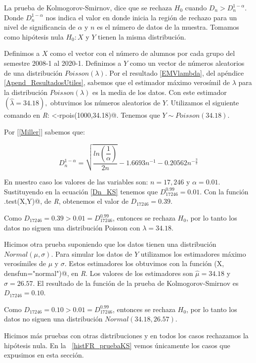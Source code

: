 La prueba de Kolmogorov-Smirnov, dice que se rechaza $H_{0}$ cuando $D_{n} > D_{n}^{1-\alpha}$. Donde $D_{n}^{1-\alpha}$ nos indica el valor en donde inicia la región de rechazo para un nivel de significancia de $\alpha$ y $n$ es el número de datos de la muestra. Tomamos como hipótesis nula $H_{0}: X$ y $Y$ tienen la misma distribución.

Definimos a $X$ como el vector con el número de alumnos por cada grupo del semestre 2008-1 al 2020-1. Definimos a $Y$ como un vector de números aleatorios de una distribución $Poisson(\lambda)$. Por el resultado \ref{EMVlambda}, del apéndice \ref{Apend_ResultadosUtiles}, sabemos que el estimador máximo verosímil de $\lambda$ para la distribución $Poisson(\lambda)$ es la media de los datos. Con este estimador $(\hat{\lambda} = 34.18),$ obtuvimos los números aleatorios de $Y$. Utilizamos el siguiente comando en \textit{R}: \verb@Y<-rpois(1000,34.18)@. Tenemos que $Y \sim Poisson(34.18)$.%

Por [\ref{Miller}] sabemos que:
  
  \begin{equation}\label{Dn_KS}
D_{n}^{1-\alpha} = \sqrt{\dfrac{ln \left(\dfrac{1}{\alpha}\right)}{2n}} - 1.6693 n^{-1} - 0.20562 n^{-\frac{3}{2}}
\end{equation}

En nuestro caso los valores de las variables son: $n = 17,246$ y $\alpha = 0.01$. Sustituyendo en la ecuación \ref{Dn_KS} tenemos que $D_{17246}^{0.99} = 0.01$. Con la función \verb@ks.test(X,Y)@, de \textit{R}, obtenemos el valor de $D_{17246} = 0.39$.

Como $D_{17246} = 0.39 > 0.01 = D_{17246}^{0.99}$, entonces se rechaza $H_{0}$, por lo tanto los datos no siguen una distribución Poisson con $\lambda = 34.18$.


Hicimos otra prueba suponiendo que los datos tienen una distribución $Normal(\mu,\sigma)$. Para simular los datos de $Y$ utilizamos los estimadores máximo verosímiles de $\mu$ y $\sigma$. Estos estimadores los obtuvimos con la función \verb@fitdistr(X, densfun="normal")@, en \textit{R}. Los valores de los estimadores son $\hat{\mu} = 34.18$ y $\hat{\sigma} = 26.57$. El resultado de la función de la prueba de Kolmogorov-Smirnov es $D_{17246} = 0.10$.

Como $D_{17246} = 0.10 > 0.01 = D_{17246}^{0.99}$, entonces se rechaza $H_{0}$, por lo tanto los datos no siguen una distribución $Normal(34.18,26.57)$.

Hicimos más pruebas con otras distribuciones y en todos los casos rechazamos la hipótesis nula. En la \figurename{~\ref{histFR_pruebaKS}} vemos únicamente los casos que expusimos en esta sección.

